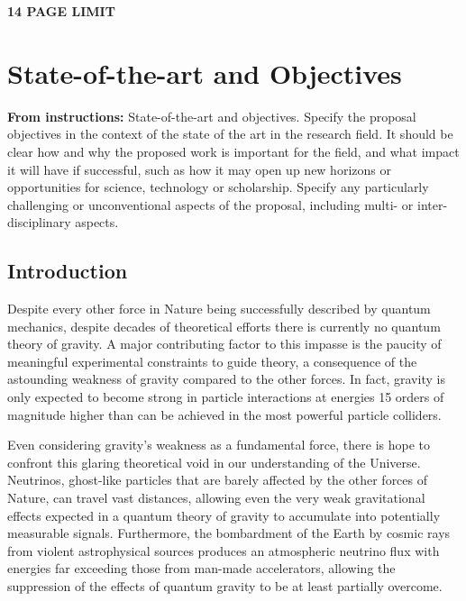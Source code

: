 \documentclass[a4paper,11pt]{article}
\newcounter{bar}
\begin{document}
\textbf{14 PAGE LIMIT}



\section{State-of-the-art and Objectives}
\vspace{0.1 cm}

\textbf{From instructions:} State-of-the-art and objectives. Specify the proposal objectives in the context of the state
of the art in the research field. It should be clear how and why the proposed work is important for
the field, and what impact it will have if successful, such as how it may open up new horizons or
opportunities for science, technology or scholarship. Specify any particularly challenging or
unconventional aspects of the proposal, including multi- or inter-disciplinary aspects.

\subsection{Introduction}

Despite every other force in Nature being successfully described by quantum mechanics, despite decades of theoretical efforts there is currently no quantum theory of gravity. A major contributing factor to this impasse is the paucity of meaningful experimental constraints to guide theory, a consequence of the astounding weakness of gravity compared to the other forces. In fact, gravity is only expected to become strong in particle interactions at energies 15 orders of magnitude higher than can be achieved in the most powerful particle colliders.

Even considering gravity's weakness as a fundamental force, there is hope to confront this glaring theoretical void in our understanding of the Universe. Neutrinos, ghost-like particles that are barely affected by the other forces of Nature, can travel vast distances, allowing even the very weak gravitational effects expected in a quantum theory of gravity to accumulate into potentially measurable signals. Furthermore, the bombardment of the Earth by cosmic rays from violent astrophysical sources produces an atmospheric neutrino flux with energies far exceeding those from man-made accelerators, allowing the suppression of the effects of quantum gravity to be at least partially overcome.
\end{document}
